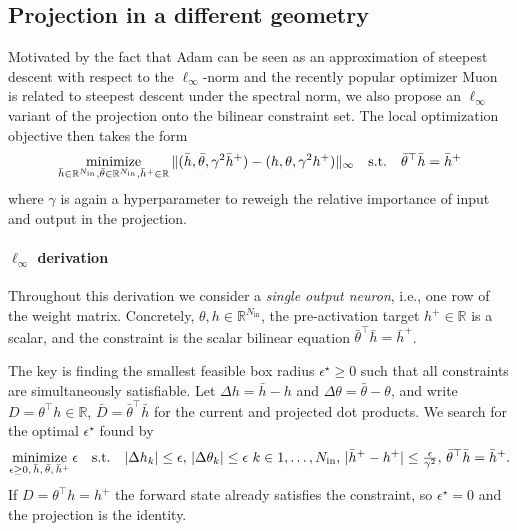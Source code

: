 \subsection{Projection in a different geometry}
Motivated by the fact that Adam \cite{kingma2014adam} can be seen as an approximation of steepest descent with respect to the $\ell_\infty$-norm  \cite{xie2024implicit} and the recently popular optimizer Muon~\cite{jordan2024muon} is related to steepest descent under the spectral norm, we also propose an $\ell_\infty$ variant of the projection onto the bilinear constraint set. The local optimization objective then takes the form
\begin{equation}
\label{eq:bilinf-proj-bilinear-layer}
\operatorname*{minimize}_{\bar{h} \in \mathbb{R}^{N_{\mathrm{in}}}, \bar{\theta} \in \mathbb{R}^{N_{\mathrm{in}}}, \bar{h}^+ \in \mathbb{R}} \| (\bar{h}, \bar{\theta}, \gamma^2 \bar{h}^+) - (h, \theta, \gamma^2 h^+) \|_\infty \quad \text{s.t.} \quad \bar{\theta}^\top \bar{h} = \bar{h}^+
\end{equation}
where $\gamma$ is again a hyperparameter to reweigh the relative importance of input and output in the projection.

\paragraph{$\ell_\infty$ derivation}
\label{sec:bilinear-inf}
\label{sec:linf}

Throughout this derivation we consider a \emph{single output neuron}, i.e., one row of
the weight matrix. Concretely, $\theta, h \in \mathbb{R}^{N_{\mathrm{in}}}$, the
pre-activation target $h^{+} \in \mathbb{R}$ is a scalar, and the constraint is the
scalar bilinear equation ${\bar\theta}^\top \bar{h} = \bar{h}^{+}$.

The key is finding the smallest feasible box radius $\epsilon^\star \geq 0$ such
that all constraints are simultaneously satisfiable. Let $\Delta h = \bar h - h$ and
$\Delta \theta = \bar \theta - \theta$, and write $D = \theta^\top h \in \mathbb{R}$,
$\bar D = \bar\theta^\top \bar h $ for the current and projected dot
products. We search for the optimal $\epsilon^\star$ found by
\[
\operatorname*{minimize}_{\epsilon \ge 0,\,\bar h,\,\bar\theta,\,\bar h^{+}} \epsilon
\quad\text{s.t.}\quad
|\Delta h_k| \le \epsilon,\,
|\Delta \theta_k| \le \epsilon\ k\in1,\dots,N_{\mathrm{in}},\,
|\bar h^{+}-h^{+}| \le \tfrac{\epsilon}{\gamma^2},\,
\bar\theta^\top \bar h = \bar h^{+}.
\]
If $D = \theta^\top h = h^+$ the forward state
already satisfies the constraint, so $\epsilon^\star = 0$ and the projection is the
identity.

